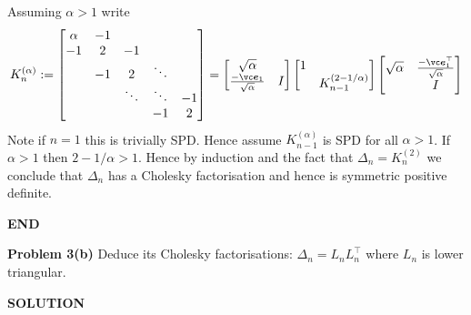 \documentclass[12pt,a4paper]{article}
\def\e{ {\vc e} }
\begin{document}
Assuming $\ensuremath{\alpha} > 1$ write
\[
K_n^{(\ensuremath{\alpha})} := \begin{bmatrix}
\ensuremath{\alpha} & -1 \\
-1 & 2 & -1 \\
& -1 & 2 & \ensuremath{\ddots} \\
&& \ensuremath{\ddots} & \ensuremath{\ddots} & -1 \\
&&& -1 & 2
\end{bmatrix} =
                    \begin{bmatrix} \sqrt{\ensuremath{\alpha}} \\
                                    {-\ensuremath{\bm{\e}}_1 \over \sqrt{\ensuremath{\alpha}}} & I
                                        \end{bmatrix}
                    \begin{bmatrix}1 \\ & K_{n-1}^{(2 - 1/\ensuremath{\alpha})} \end{bmatrix}
                    \begin{bmatrix} \sqrt{\ensuremath{\alpha}} & {-\ensuremath{\bm{\e}}_1^\ensuremath{\top} \over \sqrt{\ensuremath{\alpha}}} \\
                                                            & I
                                        \end{bmatrix}
\]
Note if $n = 1$ this is trivially SPD. Hence assume $K_{n-1}^{(\ensuremath{\alpha})}$ is SPD for all $\ensuremath{\alpha} > 1$. If $\ensuremath{\alpha} > 1$ then $2 - 1/\ensuremath{\alpha} > 1$. Hence by induction and the fact that $\ensuremath{\Delta}_n = K_n^{(2)}$ we conclude that $\ensuremath{\Delta}_n$ has a Cholesky factorisation and hence is symmetric positive definite.

\textbf{END}

\textbf{Problem 3(b)} Deduce its Cholesky factorisations: $\ensuremath{\Delta}_n = L_n L_n^\ensuremath{\top}$ where $L_n$ is lower triangular.

\textbf{SOLUTION}
\end{document}
